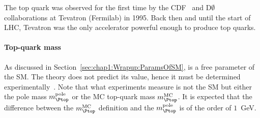The top quark was observed for the first time by the CDF~\cite{CDF:1995wbb} and D$\emptyset$~\cite{D0:1995jca} collaborations
at Tevatron (Fermilab) in 1995. 
Back then and until the start of LHC, Tevatron was the only accelerator powerful enough to produce top quarks. %


\paragraph{Top-quark mass}\mbox{}

As discussed in Section~\ref{sec:chap1:Wrapup:ParamsOfSM}, \mtop is a free parameter 
of the SM. The theory does not predict its value, hence it must be determined experimentally~\cite{Alioli:2013mxa}. 
Note that what experiments measure is not the SM \mtop but either the pole mass $\mtop^{\text{pole}}$ or
the MC top-quark mass $\mtop^{\text{MC}}$. It is expected that the difference between the $\mtop^{\text{MC}}$ definition 
and the $\mtop^{\text{pole}}$ is of the order of $1$~GeV. %

